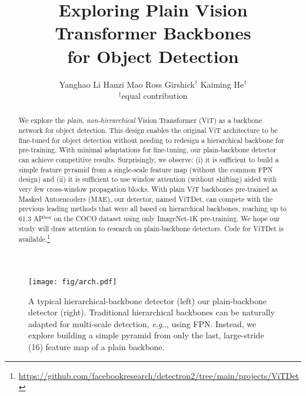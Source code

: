 \documentclass[runningheads]{llncs}
\makeatletter
\DeclareRobustCommand\onedot{\futurelet\@let@token\@onedot}
\def\@onedot{\ifx\@let@token.\else.\null\fi\xspace}
\def\eg{\emph{e.g}\onedot} \def\Eg{\emph{E.g}\onedot}
\makeatother
\begin{document}
\pagestyle{headings}
\mainmatter

\title{Exploring Plain Vision Transformer Backbones \\ for Object Detection \vspace{-.5em}}

\titlerunning{~}
\author{
Yanghao Li \quad
Hanzi Mao \quad
Ross Girshick$^\dagger$ \quad
Kaiming He$^\dagger$
\\{\scriptsize $^\dagger$equal contribution}
}
\authorrunning{~}
\maketitle

\begin{abstract}
\vspace{-2em}
We explore the \textit{plain}, \textit{non-hierarchical} Vision Transformer (ViT) as a backbone network for object detection. This design enables the original ViT architecture to be fine-tuned for object detection without needing to redesign a hierarchical backbone for pre-training. With minimal adaptations for fine-tuning, our plain-backbone detector can achieve competitive results. Surprisingly, we observe: (i) it is sufficient to build a simple feature pyramid from a single-scale feature map (without the common FPN design) and (ii) it is sufficient to use window attention (without shifting) aided with very few cross-window propagation blocks. With plain ViT backbones pre-trained as Masked Autoencoders (MAE), our detector, named \mbox{ViTDet}, can compete with the previous leading methods that were all based on hierarchical backbones, reaching up to 61.3 AP$^\text{box}$ on the COCO dataset using only ImageNet-1K pre-training. We hope our study will draw attention to research on plain-backbone detectors. Code for ViTDet is available.\footnote{\url{https://github.com/facebookresearch/detectron2/tree/main/projects/ViTDet}}
\vspace{-2em}
\end{abstract}
    

\begin{figure}[t]
\vspace{-.5em}
\centering
\texttt{[image: fig/arch.pdf]}
\vspace{-1.2em}
\caption{A typical hierarchical-backbone detector (left) \vs our plain-backbone detector (right).
Traditional  hierarchical backbones can be naturally adapted for multi-scale detection, \eg, using FPN. Instead, we explore building a simple pyramid from only the last, large-stride (16) feature map of a plain backbone.
}
\label{fig:arch}
\vspace{-.75em}
\end{figure}
\end{document}
